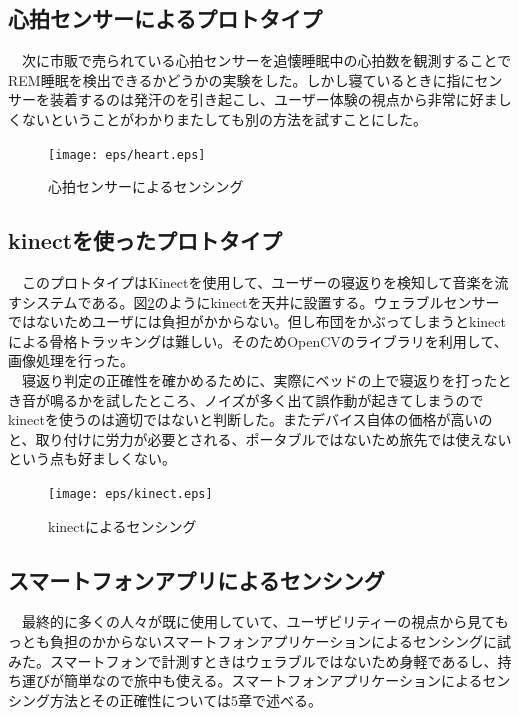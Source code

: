 \subsection{心拍センサーによるプロトタイプ}
　次に市販で売られている心拍センサーを追懐睡眠中の心拍数を観測することでREM睡眠を検出できるかどうかの実験をした。しかし寝ているときに指にセンサーを装着するのは発汗のを引き起こし、ユーザー体験の視点から非常に好ましくないということがわかりまたしても別の方法を試すことにした。

\begin{figure}[htbp]
\begin{center}
\texttt{[image: eps/heart.eps]}
\caption{心拍センサーによるセンシング}
\label{heart}
\end{center}
\end{figure}

\subsection{kinectを使ったプロトタイプ}
　このプロトタイプはKinectを使用して、ユーザーの寝返りを検知して音楽を流すシステムである。図\ref{kinect}のようにkinectを天井に設置する。ウェラブルセンサーではないためユーザには負担がかからない。但し布団をかぶってしまうとkinectによる骨格トラッキングは難しい。そのためOpenCVのライブラリを利用して、画像処理を行った。\\
　寝返り判定の正確性を確かめるために、実際にベッドの上で寝返りを打ったとき音が鳴るかを試したところ、ノイズが多く出て誤作動が起きてしまうのでkinectを使うのは適切ではないと判断した。またデバイス自体の価格が高いのと、取り付けに労力が必要とされる、ポータブルではないため旅先では使えないという点も好ましくない。

\begin{figure}[htbp]
\begin{center}
\texttt{[image: eps/kinect.eps]}
\caption{kinectによるセンシング}
\label{kinect}
\end{center}
\end{figure}

\subsection{スマートフォンアプリによるセンシング}
　最終的に多くの人々が既に使用していて、ユーザビリティーの視点から見てもっとも負担のかからないスマートフォンアプリケーションによるセンシングに試みた。スマートフォンで計測すときはウェラブルではないため身軽であるし、持ち運びが簡単なので旅中も使える。スマートフォンアプリケーションによるセンシング方法とその正確性については5章で述べる。
